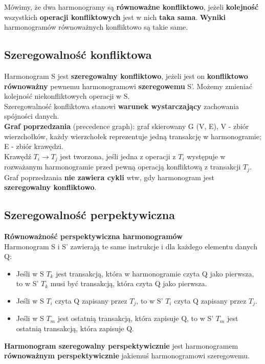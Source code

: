 \documentclass[a4paper]{article}
\begin{document}
Mówimy, że dwa harmonogramy są \textbf{równoważne konfliktowo}, jeżeli \textbf{kolejność} wszystkich \textbf{operacji konfliktowych} jest w nich \textbf{taka sama}. \textbf{Wyniki} harmonogramów równoważnych konfliktowo są takie same.\\

\subsection{Szeregowalność konfliktowa}
Harmonogram S jest \textbf{szeregowalny konfliktowo}, jeżeli jest on \textbf{konfliktowo równoważny} pewnemu harmonogramowi \textbf{szeregowemu} S’. Możemy
zmieniać kolejność niekonfliktowych operacji w S. \\
Szeregowalność konfliktowa stanowi \textbf{warunek wystarczający} zachowania spójności danych.\\

\textbf{Graf poprzedzania} (precedence graph): graf skierowany
G (V, E), V - zbiór wierzchołków, każdy wierzchołek reprezentuje jedną transakcję w harmonogramie; E - zbiór krawędzi.\\
Krawędź $T_i \rightarrow T_j$ jest tworzona, jeśli jedna z operacji z $T_i$ występuje w rozważanym harmonogramie
przed pewną operacją konfliktową z transakcji $T_j$.\\
Graf poprzedzania \textbf{nie zawiera cykli} wtw, gdy harmonogram jest \textbf{szeregowalny konfliktowo}.

\subsection{Szeregowalność perpektywiczna}
\textbf{Równoważność perspektywiczna harmonogramów}\\
Harmonogram S i S' zawierają te same instrukcje i dla każdego elementu danych Q:
\begin{itemize}
    \item Jeśli w S $T_k$ jest transakcją, która w
    harmonogramie czyta Q jako pierwsza, to w S' $T_k$ musi być transakcją, która czyta Q jako pierwsza.
    \item Jeśli w S $T_i$ czyta Q zapisany przez $T_j$, to w S' $T_i$ czyta Q zapisany przez $T_j$.
    \item Jeśli w S  $T_m$ jest ostatnią transakcją, która
    zapisuje Q, to w S' $T_m$ jest ostatnią transakcją, która zapisuje Q.
\end{itemize}

\textbf{Harmonogram szeregowalny perspektywicznie} jest harmonogramem \textbf{równoważnym perspektywicznie} jakiemuś harmonogramowi szeregowemu.\\
\end{document}
